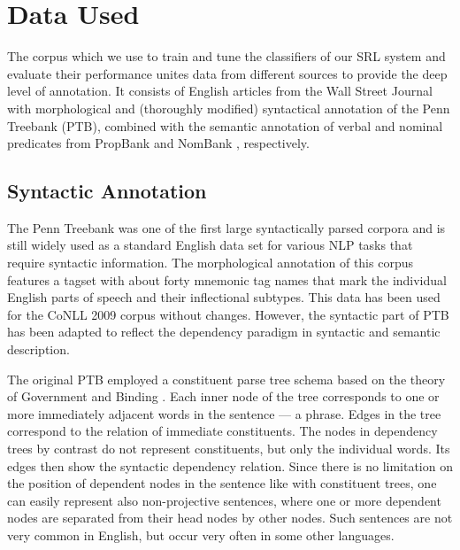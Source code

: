 \documentclass[12pt,notitlepage]{report}
\begin{document}
%
%
\chapter{Data Used}\label{data}
%
%

The corpus which we use to train and tune the classifiers of our SRL system and evaluate their performance \citep{surdeanu08,hajic09} unites data from different sources to provide the deep level of annotation. It consists of English articles from the Wall Street Journal with morphological and (thoroughly modified) syntactical annotation of the Penn Treebank (PTB), \citep{marcus93} combined with the semantic annotation of verbal and nominal predicates from PropBank \citep{palmer05} and NomBank \citep{meyers04}, respectively.

\section{Syntactic Annotation}

The Penn Treebank was one of the first large syntactically parsed corpora and is still widely used as a standard English data set for various NLP tasks that require syntactic information. The morphological annotation of this corpus features a tagset \citep{santorini90} with about forty mnemonic tag names that mark the individual English parts of speech and their inflectional subtypes. This data has been used for the CoNLL 2009 corpus without changes. However, the syntactic part of PTB has been adapted to reflect the dependency paradigm in syntactic and semantic description.

The original PTB employed a constituent parse tree schema based on the theory of Government and Binding \citep{chomsky81}. Each inner node of the tree corresponds to one or more immediately adjacent words in the sentence --- a phrase. Edges in the tree correspond to the relation of immediate constituents. The nodes in dependency trees by contrast do not represent constituents, but only the individual words. Its edges then show the syntactic dependency relation. Since there is no limitation on the position of dependent nodes in the sentence like with constituent trees, one can easily represent also non-projective sentences, where one or more dependent nodes are separated from their head nodes by other nodes. Such sentences are not very common in English, but occur very often in some other languages.
\end{document}
